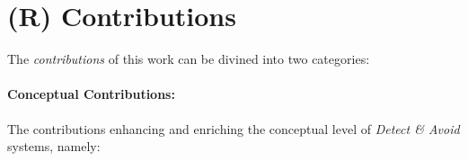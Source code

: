 \setcounter{chapter}{1}
\setcounter{section}{3}
\setcounter{subsection}{0}
\section{(R) Contributions}\label{s:Contributions} 
\noindent The \emph{contributions} of this work can be divined into two categories:
    
\paragraph{Conceptual Contributions:} The contributions enhancing and enriching the conceptual level of \emph{Detect \& Avoid} systems, namely:

